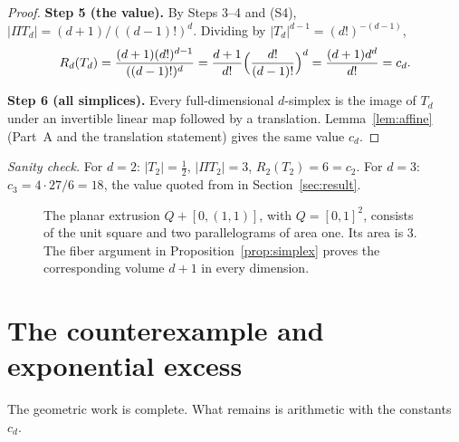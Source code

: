 \documentclass[11pt]{article}
\newcommand{\step}[1]{\smallskip\noindent\textbf{#1}}
\begin{document}
\begin{proof}
\step{Step 5 (the value).} By Steps 3--4 and (S4),
\(|\Pi T_d|=(d+1)/((d-1)!)^d\). Dividing by \(|T_d|^{d-1}=(d!)^{-(d-1)}\),
\[
 R_d(T_d)=\frac{(d+1)(d!)^{d-1}}{((d-1)!)^d}
 =\frac{d+1}{d!}\Bigl(\frac{d!}{(d-1)!}\Bigr)^d
 =\frac{(d+1)d^d}{d!}=c_d.
\]

\step{Step 6 (all simplices).} Every full-dimensional \(d\)-simplex is the
image of \(T_d\) under an invertible linear map followed by a translation.
Lemma~\ref{lem:affine} (Part~A and the translation statement) gives the
same value \(c_d\).
\end{proof}

\emph{Sanity check.} For \(d=2\): \(|T_2|=\tfrac12\), \(|\Pi T_2|=3\),
\(R_2(T_2)=6=c_2\). For \(d=3\): \(c_3=4\cdot27/6=18\), the value quoted
from \cite{ChenEtAl} in Section~\ref{sec:result}.

\begin{figure}[tb]
\centering
{}
\caption{The planar extrusion \(Q+[0,(1,1)]\), with
\(Q=[0,1]^2\), consists of the unit square and two parallelograms of
area one. Its area is \(3\). The fiber argument in
Proposition~\ref{prop:simplex} proves the corresponding volume \(d+1\)
in every dimension.}
\label{fig:extrusion}
\end{figure}

\section{The counterexample and exponential excess}\label{sec:counterexample}

The geometric work is complete. What remains is arithmetic with the
constants \(c_d\).
\end{document}
